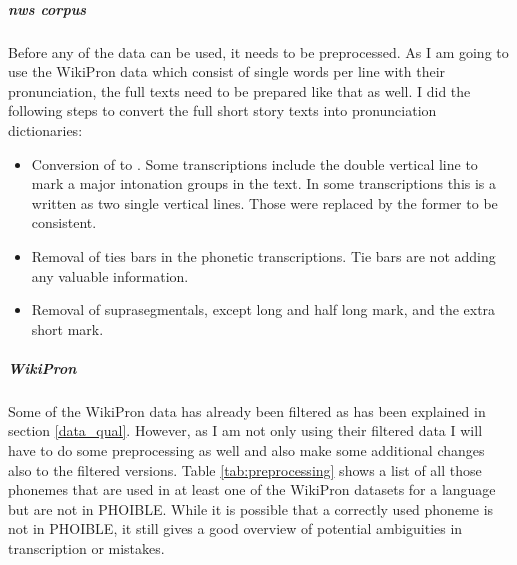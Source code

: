 \subparagraph{\ac{nws} corpus}
Before any of the data can be used, it needs to be preprocessed. As I am going to use the WikiPron data which consist of single words per line with their pronunciation, the full texts need to be prepared like that as well. I did the following steps to convert the full short story texts into pronunciation dictionaries:

\begin{itemize}
\item Conversion of \textipa{\textvertline \textvertline} to \textipa{\textdoublevertline}. Some transcriptions include the double vertical line to mark a major intonation groups in the text. In some transcriptions this is a written as two single vertical lines. Those were replaced by the former to be consistent. 
\item Removal of ties bars in the phonetic transcriptions. Tie bars are not adding any valuable information. 
\item Removal of suprasegmentals, except long and half long mark, and the extra short mark. 
\end{itemize}


\subparagraph{WikiPron} Some of the WikiPron data has already been filtered as has been explained in section \ref{data_qual}. However, as I am not only using their filtered data I will have to do some preprocessing as well and also make some additional changes also to the filtered versions. Table \ref{tab:preprocessing} shows a list of all those phonemes that are used in at least one of the WikiPron datasets for a language but are not in PHOIBLE. While it is possible that a correctly used phoneme is not in PHOIBLE, it still gives a good overview of potential ambiguities in transcription or mistakes.

